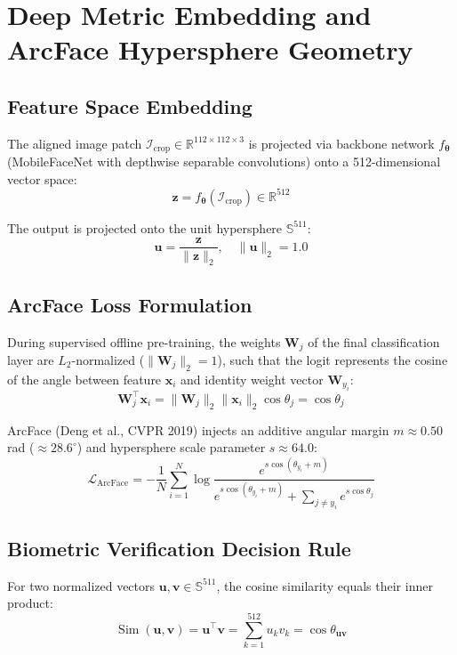 \documentclass[11pt,a4paper]{article}
\begin{document}
\section{Deep Metric Embedding and ArcFace Hypersphere Geometry}

\subsection{Feature Space Embedding}
The aligned image patch $\mathcal{I}_{\text{crop}} \in \mathbb{R}^{112 \times 112 \times 3}$ is projected via backbone network $f_{\bm{\theta}}$ (MobileFaceNet with depthwise separable convolutions) onto a 512-dimensional vector space:
\begin{equation}
\mathbf{z} = f_{\bm{\theta}}(\mathcal{I}_{\text{crop}}) \in \mathbb{R}^{512}
\end{equation}

The output is projected onto the unit hypersphere $\mathbb{S}^{511}$:
\begin{equation}
\mathbf{u} = \frac{\mathbf{z}}{\|\mathbf{z}\|_2}, \quad \|\mathbf{u}\|_2 = 1.0
\end{equation}

\subsection{ArcFace Loss Formulation}
During supervised offline pre-training, the weights $\mathbf{W}_j$ of the final classification layer are $L_2$-normalized ($\|\mathbf{W}_j\|_2 = 1$), such that the logit represents the cosine of the angle between feature $\mathbf{x}_i$ and identity weight vector $\mathbf{W}_{y_i}$:
\begin{equation}
\mathbf{W}_j^\top \mathbf{x}_i = \|\mathbf{W}_j\|_2 \|\mathbf{x}_i\|_2 \cos \theta_j = \cos \theta_j
\end{equation}

ArcFace (Deng et al., CVPR 2019) injects an additive angular margin $m \approx 0.50$ rad ($\approx 28.6^\circ$) and hypersphere scale parameter $s \approx 64.0$:
\begin{equation}
\mathcal{L}_{\text{ArcFace}} = -\frac{1}{N} \sum_{i=1}^N \log \frac{e^{s \cos(\theta_{y_i} + m)}}{e^{s \cos(\theta_{y_i} + m)} + \sum_{j \neq y_i} e^{s \cos \theta_j}}
\end{equation}

\subsection{Biometric Verification Decision Rule}
For two normalized vectors $\mathbf{u}, \mathbf{v} \in \mathbb{S}^{511}$, the cosine similarity equals their inner product:
\begin{equation}
\operatorname{Sim}(\mathbf{u}, \mathbf{v}) = \mathbf{u}^\top \mathbf{v} = \sum_{k=1}^{512} u_k v_k = \cos \theta_{\mathbf{u}\mathbf{v}}
\end{equation}
\end{document}
